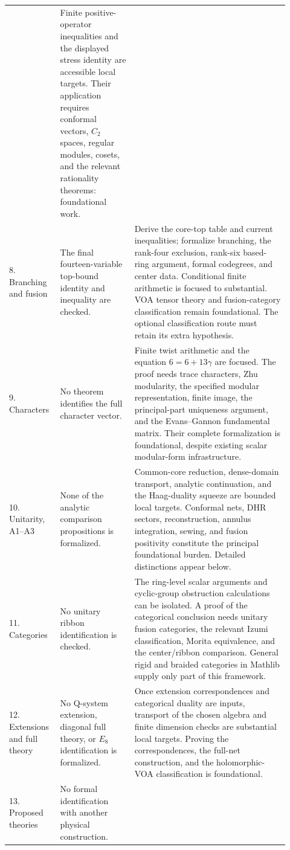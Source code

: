 \begin{longtable}{@{}P{0.15\linewidth}P{0.25\linewidth}P{0.52\linewidth}@{}}
& Finite positive-operator inequalities and the displayed stress
identity are accessible local targets. Their application requires
conformal vectors, $C_2$ spaces, regular modules, cosets, and the
relevant rationality theorems: foundational work.\\
8. Branching and fusion
& The final fourteen-variable top-bound identity and inequality are
checked.
& Derive the core-top table and current inequalities; formalize
branching, the rank-four exclusion, rank-six based-ring argument,
formal codegrees, and center data. Conditional finite arithmetic is
focused to substantial. VOA tensor theory and fusion-category
classification remain foundational. The optional classification
route must retain its extra hypothesis.\\
9. Characters
& No theorem identifies the full character vector.
& Finite twist arithmetic and the equation $6=6+13\gamma$ are focused.
The proof needs trace characters, Zhu modularity, the specified
modular representation, finite image, the principal-part uniqueness
argument, and the Evans--Gannon fundamental matrix. Their complete
formalization is foundational, despite existing scalar modular-form
infrastructure.\\
10. Unitarity, A1--A3
& None of the analytic comparison propositions is formalized.
& Common-core reduction, dense-domain transport, analytic continuation,
and the Haag-duality squeeze are bounded local targets. Conformal
nets, DHR sectors, reconstruction, annulus integration, sewing, and
fusion positivity constitute the principal foundational burden.
Detailed distinctions appear below.\\
11. Categories
& No unitary ribbon identification is checked.
& The ring-level scalar arguments and cyclic-group obstruction
calculations can be isolated. A proof of the categorical conclusion
needs unitary fusion categories, the relevant Izumi classification,
Morita equivalence, and the center/ribbon comparison. General rigid
and braided categories in Mathlib supply only part of this framework.\\
12. Extensions and full theory
& No Q-system extension, diagonal full theory, or $E_8$ identification
is formalized.
& Once extension correspondences and categorical duality are inputs,
transport of the chosen algebra and finite dimension checks are
substantial local targets. Proving the correspondences, the full-net
construction, and the holomorphic-VOA classification is foundational.\\
13. Proposed theories
& No formal identification with another physical construction.

\end{longtable}
